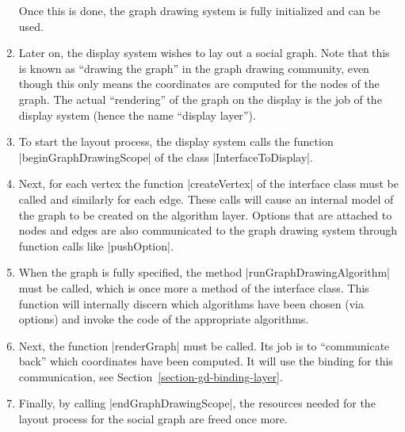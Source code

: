 \begin{enumerate}
        Once this is done, the graph drawing system is fully initialized and
        can be used.
    \item Later on, the display system wishes to lay out a social graph. Note
        that this is known as ``drawing the graph'' in the graph drawing
        community, even though this only means the coordinates are computed for
        the nodes of the graph. The actual ``rendering'' of the graph on the
        display is the job of the display system (hence the name ``display
        layer'').
    \item To start the layout process, the display system calls the function
        |beginGraphDrawingScope| of the class |InterfaceToDisplay|.
    \item Next, for each vertex the function |createVertex| of the interface
        class must be called and similarly for each edge. These calls will
        cause an internal model of the graph to be created on the algorithm
        layer. Options that are attached to nodes and edges are also
        communicated to the graph drawing system through function calls like
        |pushOption|.
    \item When the graph is fully specified, the method
        |runGraphDrawingAlgorithm| must be called, which is once more a method
        of the interface class. This function will internally discern which
        algorithms have been chosen (via options) and invoke the code of the
        appropriate algorithms.
    \item Next, the function |renderGraph| must be called. Its job is to
        ``communicate back'' which coordinates have been computed. It will use
        the binding for this communication, see
        Section~\ref{section-gd-binding-layer}.
    \item Finally, by calling |endGraphDrawingScope|, the resources needed for
        the layout process for the social graph are freed once more.
\end{enumerate}

